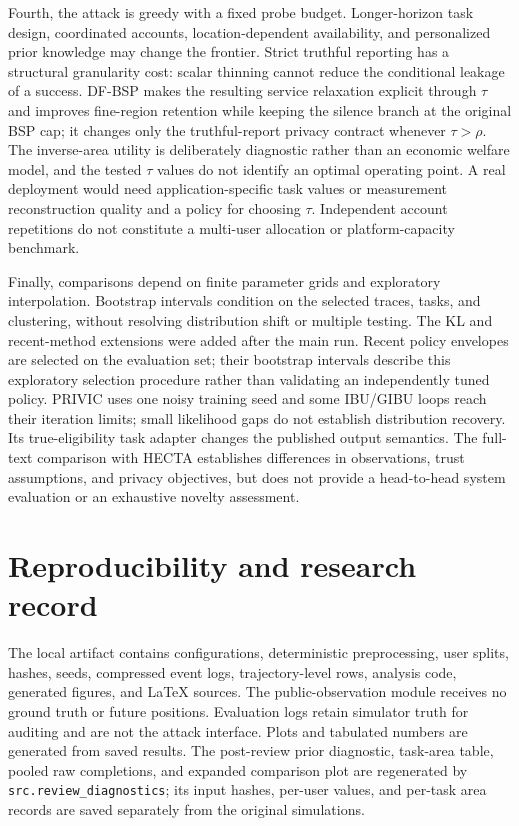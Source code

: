 \documentclass[review,12pt]{elsarticle}
\begin{document}
Fourth, the attack is greedy with a fixed probe budget. Longer-horizon task design, coordinated accounts, location-dependent availability, and personalized prior knowledge may change the frontier. Strict truthful reporting has a structural granularity cost: scalar thinning cannot reduce the conditional leakage of a success. DF-BSP makes the resulting service relaxation explicit through $\tau$ and improves fine-region retention while keeping the silence branch at the original BSP cap; it changes only the truthful-report privacy contract whenever $\tau>\rho$. The inverse-area utility is deliberately diagnostic rather than an economic welfare model, and the tested $\tau$ values do not identify an optimal operating point. A real deployment would need application-specific task values or measurement reconstruction quality and a policy for choosing $\tau$. Independent account repetitions do not constitute a multi-user allocation or platform-capacity benchmark.

Finally, comparisons depend on finite parameter grids and exploratory interpolation. Bootstrap intervals condition on the selected traces, tasks, and clustering, without resolving distribution shift or multiple testing. The KL and recent-method extensions were added after the main run. Recent policy envelopes are selected on the evaluation set; their bootstrap intervals describe this exploratory selection procedure rather than validating an independently tuned policy. PRIVIC uses one noisy training seed and some IBU/GIBU loops reach their iteration limits; small likelihood gaps do not establish distribution recovery. Its true-eligibility task adapter changes the published output semantics. The full-text comparison with HECTA establishes differences in observations, trust assumptions, and privacy objectives, but does not provide a head-to-head system evaluation or an exhaustive novelty assessment.

\section{Reproducibility and research record}
The local artifact contains configurations, deterministic preprocessing, user splits, hashes, seeds, compressed event logs, trajectory-level rows, analysis code, generated figures, and LaTeX sources. The public-observation module receives no ground truth or future positions. Evaluation logs retain simulator truth for auditing and are not the attack interface. Plots and tabulated numbers are generated from saved results. The post-review prior diagnostic, task-area table, pooled raw completions, and expanded comparison plot are regenerated by \texttt{src.review\_diagnostics}; its input hashes, per-user values, and per-task area records are saved separately from the original simulations.
\end{document}
